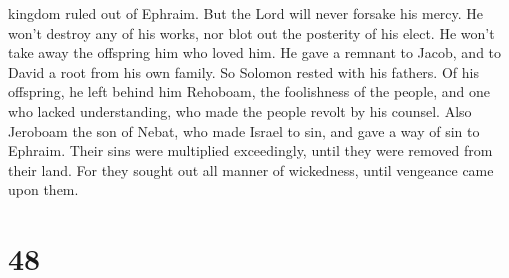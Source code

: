 kingdom ruled out of Ephraim.  But the Lord will never
forsake his mercy. He won't destroy any of his works, nor blot out the
posterity of his elect. He won't take away the offspring him who loved
him. He gave a remnant to Jacob, and to David a root from his own
family.  So Solomon rested with his fathers. Of his
offspring, he left behind him Rehoboam, the foolishness of the people,
and one who lacked understanding, who made the people revolt by his
counsel. Also Jeroboam the son of Nebat, who made Israel to sin, and
gave a way of sin to Ephraim.  Their sins were multiplied
exceedingly, until they were removed from their land. 
For they sought out all manner of wickedness, until vengeance came upon
them.

\hypertarget{section-34}{%
\section{48}\label{section-34}}

